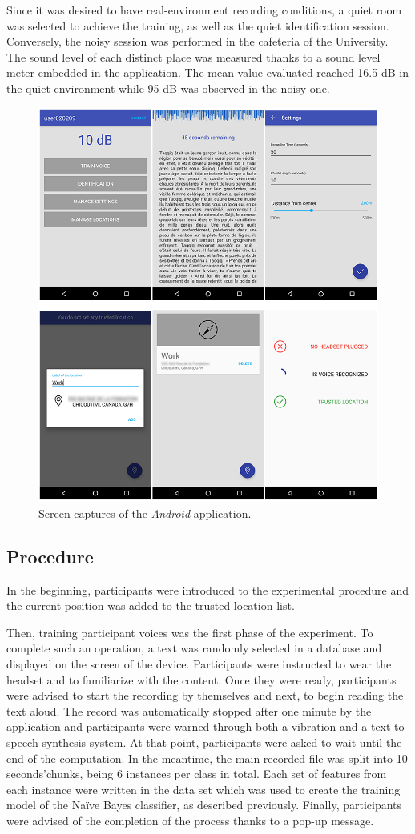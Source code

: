 \documentclass[cryptography,article,submit,moreauthors,pdftex,10pt,a4paper]{mdpi}
\begin{document}
Since it was desired to have real-environment recording conditions, a quiet room was selected to achieve the training, as well as the quiet identification session. Conversely, the noisy session was performed in the cafeteria of the University. The sound level of each distinct place was measured thanks to a sound level meter embedded in the application. The mean value evaluated reached 16.5 dB in the quiet environment while 95 dB was observed in the noisy one.

\begin{figure}[H]
	\centering
	\includegraphics[width=8 cm]{7.png}
	\caption{Screen captures of the \textit{Android} application.}
	\label{fig:7}
\end{figure}

\subsection{Procedure}

In the beginning, participants were introduced to the experimental procedure and the current position was added to the trusted location list.

Then, training participant voices was the first phase of the experiment. To complete such an operation, a text was randomly selected in a database and displayed on the screen of the device. Participants were instructed to wear the headset and to familiarize with the content. Once they were ready, participants were advised to start the recording by themselves and next, to begin reading the text aloud. The record was automatically stopped after one minute by the application and participants were warned through both a vibration and a text-to-speech synthesis system. At that point, participants were asked to wait until the end of the computation. In the meantime, the main recorded file was split into 10 seconds\textquoteright chunks, being 6 instances per class in total. Each set of features from each instance were written in the data set which was used to create the training model of the Na\"ive Bayes classifier, as described previously. Finally, participants were advised of the completion of the process thanks to a pop-up message.
\end{document}
